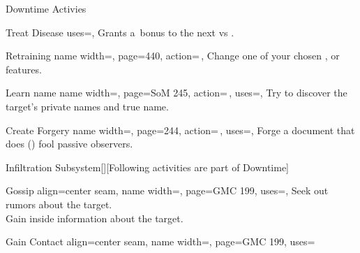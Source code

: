 \begin{PageFront}
\begin{Tables}{\frontTableHeight}
\begin{Table}{Downtime Activies}
\begin{entry}{Treat Disease}
{                uses={\Medicine[tags=T]},
            }
                Grants a \,\Cirm bonus to the next  vs . \hfill {}
            \end{entry}
            \begin{entry}{Retraining}{%
                name width=\activityLength,%
                page=440,
                action=\,,
            }
                Change one of your chosen ,  or  features.\hfill
            \end{entry}
            \begin{entry}{Learn name}{%
                name width=\activityLength,%
                page=SoM 245,
                action=\,,
                uses=\Rare \Se,
            }
                Try to discover the target's private names and true name.\hfill
            \end{entry}
            \begin{entry}{Create Forgery}{%
                name width=\activityLength,%
                page=244,
                action=\,,
                uses={\Society[tags={T,S}][val=20]},
            }
                Forge a document that does {()} fool passive observers. \hfill {}
            \end{entry}
        \end{Table}
        \vfill
        \begin{Table}{Infiltration Subsystem}[\;\dash\;][Following activities are part of
        Downtime]
            \begin{entry}{Gossip}{%
                align=center seam,
                name width=\activityLength,%
                page=GMC 199,
                uses={\Diplomacy[tags=S]},
            }
                Seek out rumors about the target. \hfill {}\\
                Gain inside information about the target. \hfill{}
            \end{entry}
            \begin{entry}{Gain Contact}{%
                align=center seam,
                name width=\activityLength,%
                page=GMC 199,
                uses={}
}
\end{entry}
\end{Table}
\end{Tables}
\end{PageFront}
